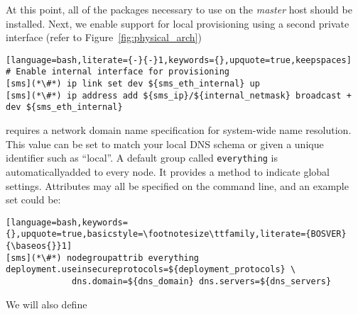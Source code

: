 At this point, all of the packages necessary to use \Confluent{} on the {\em master}
host should be installed. Next, we enable support for local provisioning using
a second private interface (refer to Figure~\ref{fig:physical_arch})

\begin{lstlisting}[language=bash,literate={-}{-}1,keywords={},upquote=true,keepspaces]
# Enable internal interface for provisioning
[sms](*\#*) ip link set dev ${sms_eth_internal} up
[sms](*\#*) ip address add ${sms_ip}/${internal_netmask} broadcast + dev ${sms_eth_internal}

\end{lstlisting}


\noindent \Confluent{} requires a network domain name specification for system-wide name
resolution. This value can be set to match your local DNS schema or given a
unique identifier such as ``local''. A default group called \texttt{everything} is 
automaticallyadded to every node. It provides a method to indicate global settings.
Attributes may all be specified on the command line, and an example set could be:

\begin{lstlisting}[language=bash,keywords={},upquote=true,basicstyle=\footnotesize\ttfamily,literate={BOSVER}{\baseos{}}1]
[sms](*\#*) nodegroupattrib everything deployment.useinsecureprotocols=${deployment_protocols} \ 
             dns.domain=${dns_domain} dns.servers=${dns_servers}
\end{lstlisting}

\noindent We will also define 